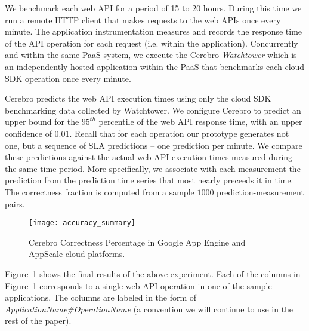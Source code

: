 We benchmark each web API for a period of 15 to 20 hours.  During this time we
run a remote HTTP client that makes requests to the web APIs once every
minute.  The application instrumentation measures and records the response
time of the API operation for each request (i.e. within the application).
Concurrently and within the same PaaS system, we execute the Cerebro
\textit{Watchtower} which is an independently hosted application within the
PaaS that benchmarks each cloud SDK operation once every minute.

Cerebro predicts the web API execution times using only the cloud SDK
benchmarking data collected by Watchtower. We configure Cerebro to predict an
upper bound for the $95^{th}$ percentile of the web API response time, with an
upper confidence of $0.01$. Recall that for each operation our prototype
generates not one, but a sequence of SLA predictions -- one prediction per
minute.  We compare these predictions against the actual web API execution
times measured during the same time period. More specifically, we
associate with each measurement the prediction from the prediction time series
that most nearly preceeds it in time.  The correctness fraction is computed
from a sample $1000$ prediction-measurement pairs.


\begin{figure}
\centering
\texttt{[image: accuracy\_summary]}
\caption{Cerebro Correctness Percentage in Google App Engine and AppScale cloud platforms.}
\label{fig:accuracy_summary}
\end{figure}

Figure~\ref{fig:accuracy_summary} shows the final results of the above experiment.
Each of the columns in Figure~\ref{fig:accuracy_summary} corresponds to a single web API operation in 
one of the sample applications. The columns are labeled in the form of \textit{ApplicationName\#OperationName} (a convention 
we will continue to use in the rest of the paper). %


